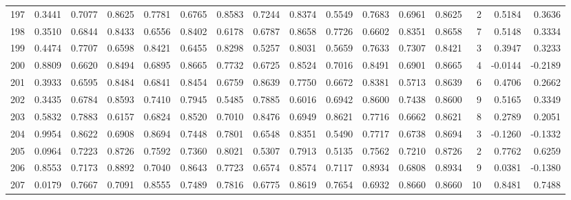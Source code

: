 \begin{tabular}{lrrrrrrrrrrrrrrr}
197 &      0.3441 &  0.7077 &  0.8625 &  0.7781 &  0.6765 &  0.8583 &  0.7244 &  0.8374 &  0.5549 &  0.7683 &   0.6961 &     0.8625 &      2 &                    0.5184 &                     0.3636 \\
198 &      0.3510 &  0.6844 &  0.8433 &  0.6556 &  0.8402 &  0.6178 &  0.6787 &  0.8658 &  0.7726 &  0.6602 &   0.8351 &     0.8658 &      7 &                    0.5148 &                     0.3334 \\
199 &      0.4474 &  0.7707 &  0.6598 &  0.8421 &  0.6455 &  0.8298 &  0.5257 &  0.8031 &  0.5659 &  0.7633 &   0.7307 &     0.8421 &      3 &                    0.3947 &                     0.3233 \\
200 &      0.8809 &  0.6620 &  0.8494 &  0.6895 &  0.8665 &  0.7732 &  0.6725 &  0.8524 &  0.7016 &  0.8491 &   0.6901 &     0.8665 &      4 &                   -0.0144 &                    -0.2189 \\
201 &      0.3933 &  0.6595 &  0.8484 &  0.6841 &  0.8454 &  0.6759 &  0.8639 &  0.7750 &  0.6672 &  0.8381 &   0.5713 &     0.8639 &      6 &                    0.4706 &                     0.2662 \\
202 &      0.3435 &  0.6784 &  0.8593 &  0.7410 &  0.7945 &  0.5485 &  0.7885 &  0.6016 &  0.6942 &  0.8600 &   0.7438 &     0.8600 &      9 &                    0.5165 &                     0.3349 \\
203 &      0.5832 &  0.7883 &  0.6157 &  0.6824 &  0.8520 &  0.7010 &  0.8476 &  0.6949 &  0.8621 &  0.7716 &   0.6662 &     0.8621 &      8 &                    0.2789 &                     0.2051 \\
204 &      0.9954 &  0.8622 &  0.6908 &  0.8694 &  0.7448 &  0.7801 &  0.6548 &  0.8351 &  0.5490 &  0.7717 &   0.6738 &     0.8694 &      3 &                   -0.1260 &                    -0.1332 \\
205 &      0.0964 &  0.7223 &  0.8726 &  0.7592 &  0.7360 &  0.8021 &  0.5307 &  0.7913 &  0.5135 &  0.7562 &   0.7210 &     0.8726 &      2 &                    0.7762 &                     0.6259 \\
206 &      0.8553 &  0.7173 &  0.8892 &  0.7040 &  0.8643 &  0.7723 &  0.6574 &  0.8574 &  0.7117 &  0.8934 &   0.6808 &     0.8934 &      9 &                    0.0381 &                    -0.1380 \\
207 &      0.0179 &  0.7667 &  0.7091 &  0.8555 &  0.7489 &  0.7816 &  0.6775 &  0.8619 &  0.7654 &  0.6932 &   0.8660 &     0.8660 &     10 &                    0.8481 &                     0.7488 \\

\end{tabular}
